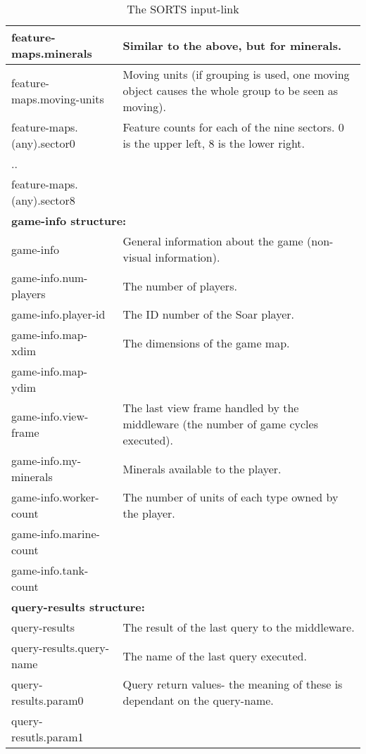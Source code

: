 \begin{center}
\begin{table}
\begin{tabular}{|l|p{4.0in}|}
\hline
feature-maps.minerals & Similar to the above, but for minerals.\\
\hline
feature-maps.moving-units & Moving units (if grouping is used, one moving object causes the whole group to be seen as moving).\\
\hline
feature-maps.(any).sector0 & Feature counts for each of the nine sectors. 0 is the upper left, 8 is the lower right.\\
.. & \\
feature-maps.(any).sector8 & \\
\hline
\multicolumn{2}{|l|}{\textbf{game-info structure:}}\\ 
\hline
game-info & General information about the game (non-visual information).\\
\hline
game-info.num-players & The number of players.\\
\hline
game-info.player-id & The ID number of the Soar player.\\
\hline
game-info.map-xdim & The dimensions of the game map. \\
game-info.map-ydim & \\
\hline
game-info.view-frame & The last view frame handled by the middleware (the number of game cycles executed).\\
\hline
game-info.my-minerals & Minerals available to the player. \\
\hline
game-info.worker-count & The number of units of each type owned by the player. \\
game-info.marine-count & \\
game-info.tank-count & \\
\hline
\multicolumn{2}{|l|}{\textbf{query-results structure:}}\\ 
\hline
query-results & The result of the last query to the middleware.\\
\hline
query-results.query-name & The name of the last query executed.\\
\hline
query-results.param0 & Query return values- the meaning of these is dependant on the query-name. \\
query-resutls.param1 & \\
\hline
\end{tabular}
\caption{The SORTS input-link}
\label{tb:input-link}
\end{table}


\end{center}
